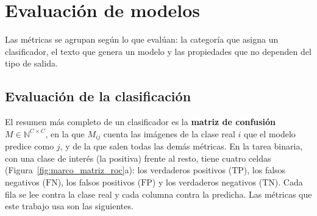 \section{Evaluación de modelos}
\label{sec:marco_evaluacion}

Las métricas se agrupan según lo que evalúan: la categoría que asigna un clasificador, el texto que genera un
modelo y las propiedades que no dependen del tipo de salida.

\subsection{Evaluación de la clasificación}
\label{sec:marco_eval_clasif}

El resumen más completo de un clasificador es la \textbf{matriz de confusión} $M \in \mathbb{N}^{C \times C}$,
en la que $M_{ij}$ cuenta las imágenes de la clase real $i$ que el modelo predice como $j$, y de la que salen
todas las demás métricas. En la tarea binaria, con una clase de interés (la positiva) frente al resto, tiene
cuatro celdas (Figura~\ref{fig:marco_matriz_roc}a): los verdaderos positivos ($\mathrm{TP}$), los falsos
negativos ($\mathrm{FN}$), los falsos positivos ($\mathrm{FP}$) y los verdaderos negativos ($\mathrm{TN}$). Cada
fila se lee contra la clase real y cada columna contra la predicha. Las métricas que este trabajo usa son las
siguientes.



